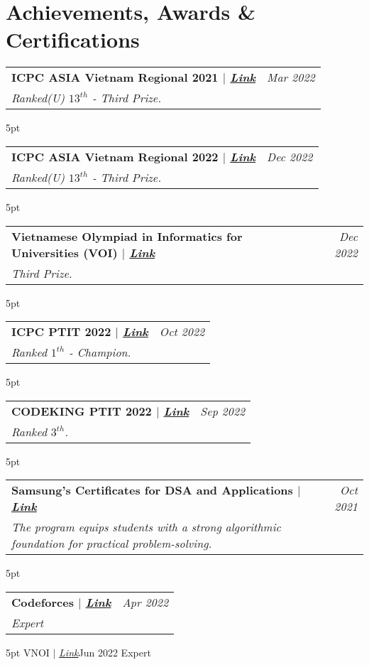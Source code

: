 \documentclass[letterpaper,11pt]{article}
\makeatletter
\newcommand{\resumeOrganizationHeading}[4]{
  \vspace{-2pt}\item
    \begin{tabular*}{0.97\textwidth}[t]{l@{\extracolsep{\fill}}r}
      \textbf{#1} & \textit{\small #2} \\
      \textit{\small#3}
    \end{tabular*}\vspace{-7pt}
}
\newcommand{\resumeSubHeadingListStart}{\begin{itemize}[leftmargin=0.15in, label={}]}
\newcommand{\resumeSubHeadingListEnd}{\end{itemize}}
\makeatother
\begin{document}
\section{Achievements, Awards \& Certifications}
\vspace{2pt}
\resumeSubHeadingListStart
\small{\item{
\resumeOrganizationHeading
{\faTrophy \hspace{4pt} ICPC ASIA Vietnam Regional 2021 $|$ \emph{\href{https://icpc.global/ICPCID/DO3D9RLNRDX8}{\color{red}Link}}}
{Mar 2022}{Ranked(U) $13^{th}$ - Third Prize.}

\vspace{5pt}

\resumeOrganizationHeading
{\faTrophy \hspace{4pt} ICPC ASIA Vietnam Regional 2022 $|$ \emph{\href{https://icpc.global/ICPCID/DO3D9RLNRDX8}{\color{red}Link}}}
{Dec 2022}{Ranked(U) $13^{th}$ - Third Prize.}

\vspace{5pt}

\resumeOrganizationHeading
{\faTrophy \hspace{4pt} Vietnamese Olympiad in Informatics for Universities (VOI) $|$ \emph{\href{https://drive.google.com/file/d/17VevlBhBMuU_wrVzSMOtZyQzstWhlA-Q/view?usp=sharing}{\color{red}Link}}}
{Dec 2022}{Third Prize.}

\vspace{5pt}

\resumeOrganizationHeading
{\faTrophy \hspace{4pt} ICPC PTIT 2022 $|$ \emph{\href{https://portal.ptit.edu.vn/le-trao-giai-cuoc-thi-lap-trinh-theo-chuan-quoc-te-icpc-icpc-ptit-2022/}{\color{red}Link}}}
{Oct 2022}{Ranked $1^{th}$ - Champion.}

\vspace{5pt}

\resumeOrganizationHeading
{\faTrophy \hspace{4pt} CODEKING PTIT 2022 $|$ \emph{\href{https://www.facebook.com/ITPTIT/photos/a.679487585460391/5532805340128567/}{\color{red}Link}}}
{Sep 2022}{Ranked $3^{th}$.}

\vspace{5pt}

\resumeOrganizationHeading
{\faCertificate \hspace{4pt} Samsung's Certificates for DSA and Applications $|$ \emph{\href{https://drive.google.com/file/d/1kNnWVGgaUS-IkM80B9xVpEJmoQGsRhfZ/view?usp=sharing}{\color{red}Link}}}{Oct 2021}
{The program equips students with a strong algorithmic foundation for practical problem-solving.}

\vspace{5pt}
\resumeOrganizationHeading
{\faStar \hspace{4pt} Codeforces $|$ \emph{\href{{https://codeforces.com/profile/Ignr_h31}}{\color{red}Link}}}{Apr 2022}
{Expert}

\vspace{5pt}
\resumeOrganizationHeading
{\faStar \hspace{4pt} VNOI $|$ \emph{\href{{https://oj.vnoi.info/user/huys31}}{\color{red}Link}}}{Jun 2022}
{Expert}


}}
\vspace{5pt}
\resumeSubHeadingListEnd
\vspace{4pt}
\end{document}
